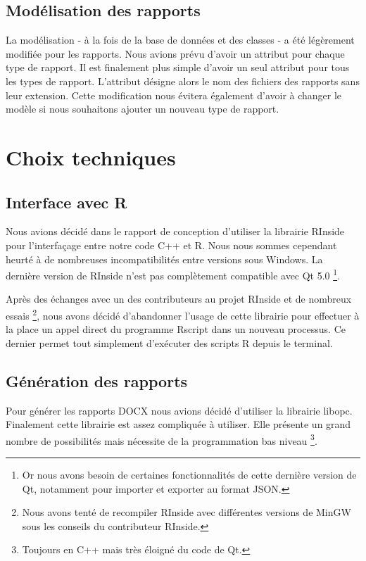 \documentclass[a4paper,titlepage,french]{report}
\begin{document}
\subsection{Modélisation des rapports}

La modélisation - à la fois de la base de données et des classes - a été légèrement modifiée pour les rapports.
Nous avions prévu d'avoir un attribut pour chaque type de rapport.
Il est finalement plus simple d'avoir un seul attribut pour tous les types de rapport.
L'attribut désigne alors le nom des fichiers des rapports sans leur extension.
Cette modification nous évitera également d'avoir à changer le modèle si nous souhaitons ajouter un nouveau type de rapport.


\section{Choix techniques}

\subsection{Interface avec R}

Nous avions décidé dans le rapport de conception d'utiliser la librairie RInside pour l'interfaçage entre notre code C++ et R.
Nous nous sommes cependant heurté à de nombreuses incompatibilités entre versions sous Windows.
La dernière version de RInside n'est pas complètement compatible avec Qt 5.0 \footnote{Or nous avons besoin de certaines fonctionnalités de cette dernière version de Qt, notamment pour importer et exporter au format JSON.}.

Après des échanges avec un des contributeurs au projet RInside et de nombreux essais \footnote{Nous avons tenté de recompiler RInside avec différentes versions de MinGW sous les conseils du contributeur RInside.}, nous avons décidé d'abandonner l'usage de cette librairie pour effectuer à la place un appel direct du programme Rscript dans un nouveau processus.
Ce dernier permet tout simplement d'exécuter des scripts R depuis le terminal.


\subsection{Génération des rapports}

Pour générer les rapports DOCX nous avions décidé d'utiliser la librairie libopc. %
Finalement cette librairie est assez compliquée à utiliser.
Elle présente un grand nombre de possibilités mais nécessite de la programmation bas niveau \footnote{Toujours en C++ mais très éloigné du code de Qt.}.
\end{document}
